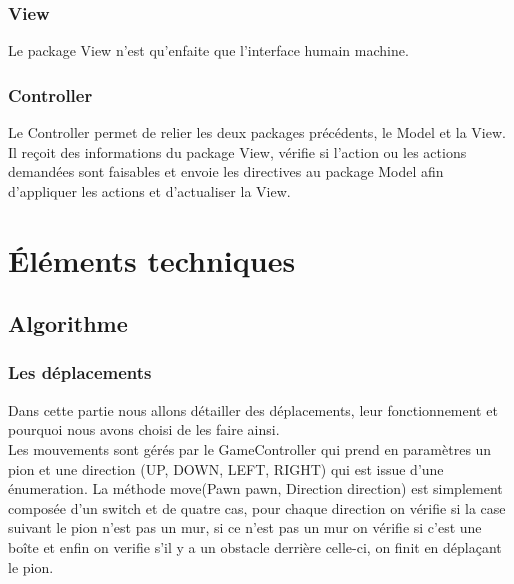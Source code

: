 \documentclass[a4paper,12pt]{article} %
\begin{document}
		\subsubsection{View}
		Le package View n'est qu'enfaite que l'interface humain machine.
	
		\subsubsection{Controller}
		Le Controller permet de relier les deux packages précédents, le Model et la View. Il reçoit des informations du package View, vérifie si l'action ou les actions demandées sont faisables et envoie les directives au package Model afin d'appliquer les actions et d'actualiser la View. 

\newpage


\section{Éléments techniques}
	
	\subsection{Algorithme}
		\subsubsection{Les déplacements}
		Dans cette partie nous allons détailler des déplacements, leur fonctionnement et pourquoi nous avons choisi de les faire ainsi.\\
		Les mouvements sont gérés par le GameController qui prend en paramètres un pion et une direction (UP, DOWN, LEFT, RIGHT) qui est issue d'une énumeration. La méthode move(Pawn pawn, Direction direction) est simplement composée d'un switch et de quatre cas, pour chaque direction on vérifie si la case suivant le pion n'est pas un mur, si ce n'est pas un mur on vérifie si c'est une boîte et enfin on verifie s'il y a un obstacle derrière celle-ci, on finit en déplaçant le pion.\\
		
		
\end{document}
